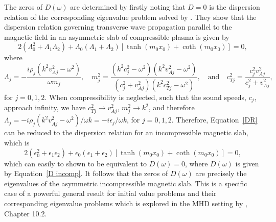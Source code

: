 \documentclass{aastex61}
\begin{document}
The zeros of $D(\omega)$ are determined by firstly noting that $D=0$ is the dispersion relation of the corresponding eigenvalue problem solved by \cite{zsa_etal18}. They show that the dispersion relation governing transverse wave propagation parallel to the magnetic field in an asymmetric slab of compressible plasma is given by
\begin{equation}
2(\Lambda_0^2 + \Lambda_1 \Lambda_2) + \Lambda_0(\Lambda_1 + \Lambda_2)[\tanh(m_0x_0) + \coth(m_0x_0)] = 0,
\label{DR}
\end{equation}
where
\begin{equation}
\Lambda_j = -\frac{i\rho_j(k^2v_{Aj}^2 - \omega^2)}{\omega m_j},
\quad
m_j^2 = \frac{(k^2c_j^2 - \omega^2)(k^2v_{Aj}^2 - \omega^2)}{(c_j^2 + v_{Aj}^2)(k^2c_{Tj}^2 - \omega^2)},
\quad
\text{and}
\quad
c_{Tj}^2 = \frac{c_j^2v_{Aj}^2}{c_j^2 + v_{Aj}^2},
\end{equation}
for $j = 0, 1, 2$. When compressibility is neglected, such that the sound speeds, $c_j$, approach infinity, we have $c_{Tj}^2 \to v_{Aj}^2$, $m_j^2 \to k^2$, and therefore $\Lambda_j = -i\rho_j(k^2v_{Aj}^2 - \omega^2)/\omega k = -i\epsilon_j / \omega k$, for $j=0,1,2$. Therefore, Equation~\eqref{DR} can be reduced to the dispersion relation for an incompressible magnetic slab, which is
\begin{equation}
2(\epsilon_0^2 + \epsilon_1 \epsilon_2) + \epsilon_0(\epsilon_1 + \epsilon_2)[\tanh(m_0x_0) + \coth(m_0x_0)] = 0,
\end{equation}
which can easily to shown to be equivalent to $D(\omega) = 0$, where $D(\omega)$ is given by Equation~\eqref{D incomp}. It follows that the zeros of $D(\omega)$ are precisely the eigenvalues of the asymmetric incompressible magnetic slab. This is a specific case of a powerful general result for initial value problems and their corresponding eigenvalue problems which is explored in the MHD setting by \cite{goe_etal04}, Chapter 10.2.
\end{document}
